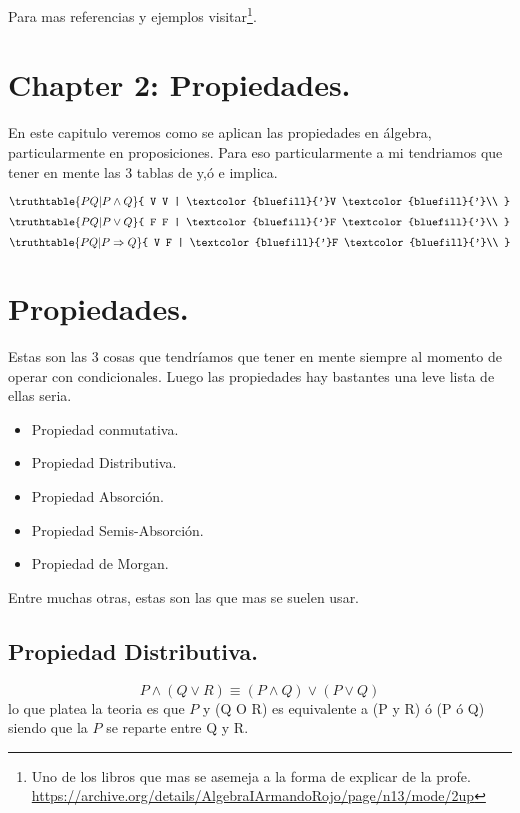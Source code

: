 \documentclass{article}
\newcommand{\bs}{\textcolor{bluefill}{'}}
\begin{document}
Para mas referencias y ejemplos visitar\footnote{Uno de los libros que mas se asemeja a la forma de explicar de la profe. \\
\url{https://archive.org/details/AlgebraIArmandoRojo/page/n13/mode/2up}}.



 \section*{Chapter 2: Propiedades.}

En este capitulo veremos como se aplican las propiedades en álgebra, particularmente en proposiciones.
Para eso particularmente a mi tendriamos que tener en mente las 3 tablas de y,ó e implica.

\begin{center}
	\[
	\truthtable{
		P Q | P \land Q
	}{  V V | \bs V \bs \\
	}
	\]
	\[
	\truthtable{
		P Q | P \lor Q
	}{  F F | \bs F \bs \\
	}
	\]
	\[
	\truthtable{
		P Q | P \Rightarrow Q
	}{  V F | \bs F \bs \\
	}
	\]
\end{center}


\section{Propiedades.}
Estas son las 3 cosas que tendríamos que tener en mente siempre al momento de operar con condicionales.
Luego las propiedades hay bastantes una leve lista de ellas seria.

\begin{itemize}
	\item Propiedad conmutativa.
	\item Propiedad Distributiva.
	\item Propiedad Absorción.
	\item Propiedad Semis-Absorción.
	\item Propiedad de Morgan.
\end{itemize}
Entre muchas otras, estas son las que mas se suelen usar.

\subsection*{Propiedad Distributiva.}

\begin{frm-thm}
	\begin{equation*}
		P \land(Q \lor R) \equiv (P \land Q) \lor (P \lor Q)
	\end{equation*}
	lo que platea la teoria es que $P$ y (Q O R) es equivalente a (P y R) ó (P ó Q) siendo que la $P$ se reparte entre Q y R.
\end{frm-thm}
\end{document}
